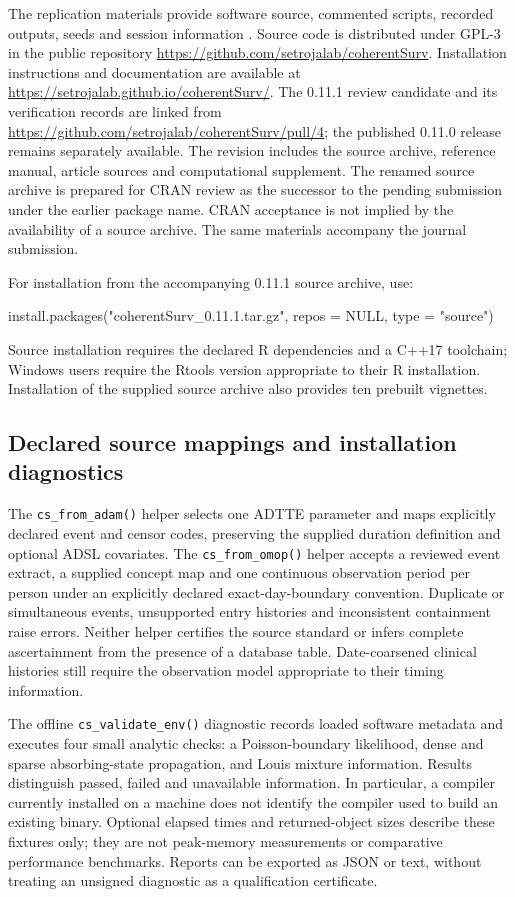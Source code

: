 \documentclass[article,nojss]{jss}
\newcommand{\code}[1]{\texttt{#1}}
\begin{document}


The replication materials provide software source, commented scripts, recorded outputs, seeds and session information \citep{JSS}. Source code is distributed under GPL-3 in the public repository \url{https://github.com/setrojalab/coherentSurv}. Installation instructions and documentation are available at \url{https://setrojalab.github.io/coherentSurv/}. The 0.11.1 review candidate and its verification records are linked from \url{https://github.com/setrojalab/coherentSurv/pull/4}; the published 0.11.0 release remains separately available. The revision includes the source archive, reference manual, article sources and computational supplement. The renamed source archive is prepared for CRAN review as the successor to the pending submission under the earlier package name. CRAN acceptance is not implied by the availability of a source archive. The same materials accompany the journal submission.

For installation from the accompanying 0.11.1 source archive, use:
\begin{Code}
install.packages("coherentSurv_0.11.1.tar.gz",
                 repos = NULL, type = "source")
\end{Code}
Source installation requires the declared R dependencies and a C++17 toolchain; Windows users require the Rtools version appropriate to their R installation. Installation of the supplied source archive also provides ten prebuilt vignettes.

\subsection{Declared source mappings and installation diagnostics}
The \code{cs\_from\_adam()} helper selects one ADTTE parameter and maps explicitly declared event and censor codes, preserving the supplied duration definition and optional ADSL covariates. The \code{cs\_from\_omop()} helper accepts a reviewed event extract, a supplied concept map and one continuous observation period per person under an explicitly declared exact-day-boundary convention. Duplicate or simultaneous events, unsupported entry histories and inconsistent containment raise errors. Neither helper certifies the source standard or infers complete ascertainment from the presence of a database table. Date-coarsened clinical histories still require the observation model appropriate to their timing information.

The offline \code{cs\_validate\_env()} diagnostic records loaded software metadata and executes four small analytic checks: a Poisson-boundary likelihood, dense and sparse absorbing-state propagation, and Louis mixture information. Results distinguish passed, failed and unavailable information. In particular, a compiler currently installed on a machine does not identify the compiler used to build an existing binary. Optional elapsed times and returned-object sizes describe these fixtures only; they are not peak-memory measurements or comparative performance benchmarks. Reports can be exported as JSON or text, without treating an unsigned diagnostic as a qualification certificate.
\end{document}
